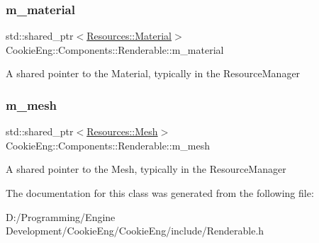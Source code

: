 \subsubsection{\texorpdfstring{m\+\_\+material}{m\_material}}
{\footnotesize\ttfamily std\+::shared\+\_\+ptr$<$\hyperlink{class_cookie_eng_1_1_resources_1_1_material}{Resources\+::\+Material}$>$ Cookie\+Eng\+::\+Components\+::\+Renderable\+::m\+\_\+material\hspace{0.3cm}{\ttfamily [protected]}}

A shared pointer to the Material, typically in the Resource\+Manager \mbox{\label{class_cookie_eng_1_1_components_1_1_renderable_a9da5e010c1d6c0ccb008b2af664b925a}} 
\subsubsection{\texorpdfstring{m\+\_\+mesh}{m\_mesh}}
{\footnotesize\ttfamily std\+::shared\+\_\+ptr$<$\hyperlink{struct_cookie_eng_1_1_resources_1_1_mesh}{Resources\+::\+Mesh}$>$ Cookie\+Eng\+::\+Components\+::\+Renderable\+::m\+\_\+mesh\hspace{0.3cm}{\ttfamily [protected]}}

A shared pointer to the Mesh, typically in the Resource\+Manager 

The documentation for this class was generated from the following file\+:\begin{DoxyCompactItemize}
\item 
D\+:/\+Programming/\+Engine Development/\+Cookie\+Eng/\+Cookie\+Eng/include/Renderable.\+h\end{DoxyCompactItemize}
